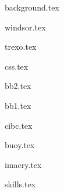 \documentclass[11pt]{article}
\begin{document}
{background.tex}


{windsor.tex}


{trexo.tex}

\vspace{0.2cm}

{css.tex}

\vspace{0.2cm}

{bb2.tex}

\vspace{0.2cm}

{bb1.tex}

\vspace{0.2cm}

{cibc.tex}


{buoy.tex}

\vspace{0.2cm}

{imacry.tex}


{skills.tex}
\end{document}
